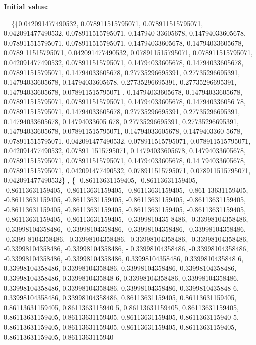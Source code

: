 {\bfseries Initial value\+:}
\begin{DoxyCode}
= \{\{0.042091477490532, 0.078911515795071, 0.078911515795071, 0.042091477490532, 0.078911515795071, 0.147940
      33605678, 0.14794033605678, 0.078911515795071, 0.078911515795071, 0.14794033605678, 0.14794033605678, 0.0789
      11515795071, 0.042091477490532, 0.078911515795071, 0.078911515795071, 0.042091477490532, 0.078911515795071, 
      0.14794033605678, 0.14794033605678, 0.078911515795071, 0.14794033605678, 0.27735296695391, 0.27735296695391,
       0.14794033605678, 0.14794033605678, 0.27735296695391, 0.27735296695391, 0.14794033605678, 0.078911515795071
      , 0.14794033605678, 0.14794033605678, 0.078911515795071, 0.078911515795071, 0.14794033605678, 0.147940336056
      78, 0.078911515795071, 0.14794033605678, 0.27735296695391, 0.27735296695391, 0.14794033605678, 0.14794033605
      678, 0.27735296695391, 0.27735296695391, 0.14794033605678, 0.078911515795071, 0.14794033605678, 0.1479403360
      5678, 0.078911515795071, 0.042091477490532, 0.078911515795071, 0.078911515795071, 0.042091477490532, 0.07891
      1515795071, 0.14794033605678, 0.14794033605678, 0.078911515795071, 0.078911515795071, 0.14794033605678, 0.14
      794033605678, 0.078911515795071, 0.042091477490532, 0.078911515795071, 0.078911515795071, 0.042091477490532\}
      ,
    \{ -0.86113631159405, -0.86113631159405, -0.86113631159405, -0.86113631159405, -0.86113631159405, -0.861
      13631159405, -0.86113631159405, -0.86113631159405, -0.86113631159405, -0.86113631159405, -0.86113631159405, 
      -0.86113631159405, -0.86113631159405, -0.86113631159405, -0.86113631159405, -0.86113631159405, -0.3399810435
      8486, -0.33998104358486, -0.33998104358486, -0.33998104358486, -0.33998104358486, -0.33998104358486, -0.3399
      8104358486, -0.33998104358486, -0.33998104358486, -0.33998104358486, -0.33998104358486, -0.33998104358486, -
      0.33998104358486, -0.33998104358486, -0.33998104358486, -0.33998104358486, 0.33998104358486, 0.3399810435848
      6, 0.33998104358486, 0.33998104358486, 0.33998104358486, 0.33998104358486, 0.33998104358486, 0.3399810435848
      6, 0.33998104358486, 0.33998104358486, 0.33998104358486, 0.33998104358486, 0.33998104358486, 0.3399810435848
      6, 0.33998104358486, 0.33998104358486, 0.86113631159405, 0.86113631159405, 0.86113631159405, 0.8611363115940
      5, 0.86113631159405, 0.86113631159405, 0.86113631159405, 0.86113631159405, 0.86113631159405, 0.8611363115940
      5, 0.86113631159405, 0.86113631159405, 0.86113631159405, 0.86113631159405, 0.86113631159405, 0.8611363115940

\end{DoxyCode}
